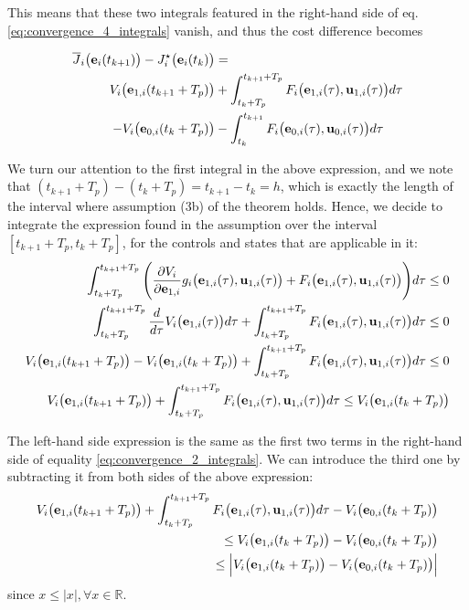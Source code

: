 This means that these two integrals featured in the right-hand side of eq.
\eqref{eq:convergence_4_integrals} vanish, and thus the cost difference becomes

\begin{align}
  \overline{J}_i\big(\bm{\mathbf{e}}_i(t_{k+1})\big) - J_i^{\star}\big(\bm{\mathbf{e}}_i(t_k)\big) &= \\
    V_i \big(\bm{\mathbf{e}}_{1,i} (t_{k+1} + T_p)\big)
    &+\int_{t_k + T_p}^{t_{k+1} + T_p} F_i \big(\bm{\mathbf{e}}_{1,i}(\tau), \bm{\mathbf{u}}_{1,i} (\tau)\big) d \tau \\
    -V_i \big(\bm{\mathbf{e}}_{0,i} (t_k + T_p)\big)
    &-\int_{t_k}^{t_{k+1}} F_i \big(\bm{\mathbf{e}}_{0,i}(\tau), \bm{\mathbf{u}}_{0,i} (\tau)\big) d \tau
\label{eq:convergence_2_integrals}
\end{align}

\begin{gg_box}
  We turn our attention to the first integral in the above expression, and we
  note that $(t_{k+1} + T_p) - (t_k + T_p) = t_{k+1} - t_k = h$, which is exactly the
  length of the interval where assumption (3b) of the theorem holds. Hence,
  we decide to integrate the expression found in the assumption over the
  interval $[t_{k+1} + T_p, t_k + T_p]$, for the controls and states that are
  applicable in it:
  \begin{align}
    \int_{t_k + T_p}^{t_{k+1} + T_p} \Bigg(\dfrac{\partial V_i}{\partial \bm{\mathbf{e}}_{1,i}} g_i\big(\bm{\mathbf{e}}_{1,i}(\tau), \bm{\mathbf{u}}_{1,i}(\tau)\big)
    + F_i\big(\bm{\mathbf{e}}_{1,i}(\tau), \bm{\mathbf{u}}_{1,i}(\tau)\big)\Bigg) d\tau \leq 0 \\
    \int_{t_k + T_p}^{t_{k+1} + T_p} \dfrac{d}{d\tau} V_i\big(\bm{\mathbf{e}}_{1,i}(\tau)\big) d \tau
    + \int_{t_k + T_p}^{t_{k+1} + T_p} F_i\big(\bm{\mathbf{e}}_{1,i}(\tau), \bm{\mathbf{u}}_{1,i}(\tau)\big) d\tau \leq 0 \\
    V_i\big(\bm{\mathbf{e}}_{1,i}(t_{k+1} + T_p)\big) - V_i\big(\bm{\mathbf{e}}_{1,i}(t_k + T_p)\big)
    + \int_{t_k + T_p}^{t_{k+1} + T_p} F_i\big(\bm{\mathbf{e}}_{1,i}(\tau), \bm{\mathbf{u}}_{1,i}(\tau)\big) d\tau \leq 0 \\
    V_i\big(\bm{\mathbf{e}}_{1,i}(t_{k+1} + T_p)\big)
    + \int_{t_k + T_p}^{t_{k+1} + T_p} F_i\big(\bm{\mathbf{e}}_{1,i}(\tau), \bm{\mathbf{u}}_{1,i}(\tau)\big) d\tau \leq V_i\big(\bm{\mathbf{e}}_{1,i}(t_k + T_p)\big)
  \end{align}

  The left-hand side expression is the same as the first two terms in the
  right-hand side of equality \eqref{eq:convergence_2_integrals}. We can
  introduce the third one by subtracting it from both sides of the above
  expression:
  \begin{align}
    V_i\big(\bm{\mathbf{e}}_{1,i}(t_{k+1} + T_p)\big)
    + \int_{t_k + T_p}^{t_{k+1} + T_p} F_i\big(\bm{\mathbf{e}}_{1,i}(\tau), \bm{\mathbf{u}}_{1,i}(\tau)\big) d\tau
    - V_i\big(\bm{\mathbf{e}}_{0,i}(t_k + T_p)\big) \\
    \leq V_i\big(\bm{\mathbf{e}}_{1,i}(t_k + T_p)\big)
    - V_i\big(\bm{\mathbf{e}}_{0,i}(t_k + T_p)\big) \\
    \leq \Big|V_i\big(\bm{\mathbf{e}}_{1,i}(t_k + T_p)\big)
    - V_i\big(\bm{\mathbf{e}}_{0,i}(t_k + T_p)\big)\Big|
  \end{align}
  since $x \leq |x|, \forall x \in \mathbb{R}$.


\end{gg_box}
